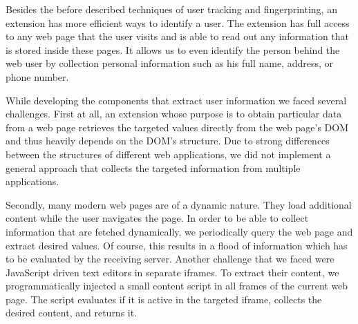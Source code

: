 	Besides the before described techniques of user tracking and fingerprinting, an extension has more efficient ways to identify a user. The extension has full access to any web page that the user visits and is able to read out any information that is stored inside these pages. It allows us to even identify the person behind the web user by collection personal information such as his full name, address, or phone number. 
	
	While developing the components that extract user information we faced several challenges. First at all, an extension whose purpose is to obtain particular data from a web page retrieves the targeted values directly from the web page's DOM and thus heavily depends on the DOM's structure. Due to strong differences between the structures of different web applications, we did not implement a general approach that collects the targeted information from multiple applications. 
	
	Secondly, many modern web pages are of a dynamic nature. They load additional content while the user navigates the page. In order to be able to collect information that are fetched dynamically, we periodically query the web page and extract desired values. Of course, this results in a flood of information which has to be evaluated by the receiving server. Another challenge that we faced were JavaScript driven text editors in separate iframes. To extract their content, we programmatically injected a small content script in all frames of the current web page. The script evaluates if it is active in the targeted iframe, collects the desired content, and returns it. 
	
